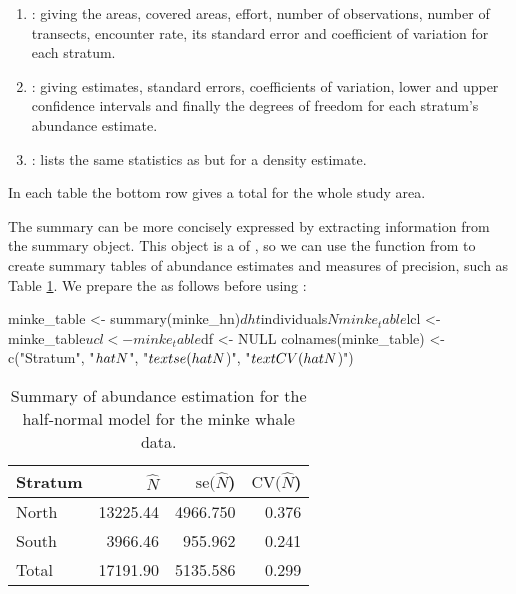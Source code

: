 \documentclass[article]{jss}\usepackage[]{graphicx}\usepackage[]{color}
\begin{document}
\begin{enumerate}
\item {}: giving the areas, covered areas, effort, number of observations, number of transects, encounter rate, its standard error and coefficient of variation for each stratum. 
\item {}: giving estimates, standard errors, coefficients of variation, lower and upper confidence intervals and finally the degrees of freedom for each stratum's abundance estimate.
\item {}: lists the same statistics as  but for a density estimate.
\end{enumerate}

In each table the bottom row gives a total for the whole study area.

The summary can be more concisely expressed by extracting information from the summary object. This object is a  of , so we can use the  function from  to create summary tables of abundance estimates and measures of precision, such as Table \ref{minke-abund}. We prepare the  as follows before using :

\begin{Code}
minke_table <- summary(minke_hn)$dht$individuals$N
minke_table$lcl <- minke_table$ucl <- minke_table$df <- NULL
colnames(minke_table) <- c("Stratum", "$\\hat{N}$", "$\\text{se}(\\hat{N}$)", 
                           "$\\text{CV}(\\hat{N}$)")
\end{Code}

\begin{table}

\caption{\label{tab:minke-abundance-table}Summary of abundance estimation for the half-normal model for the minke whale data.\label{minke-abund}}
\centering
\begin{tabular}[t]{lrrr}
\toprule
Stratum & $\hat{N}$ & $\text{se}(\hat{N}$) & $\text{CV}(\hat{N}$)\\
\midrule
North & 13225.44 & 4966.750 & 0.376\\
South & 3966.46 & 955.962 & 0.241\\
Total & 17191.90 & 5135.586 & 0.299\\
\bottomrule
\end{tabular}
\end{table}
\end{document}
